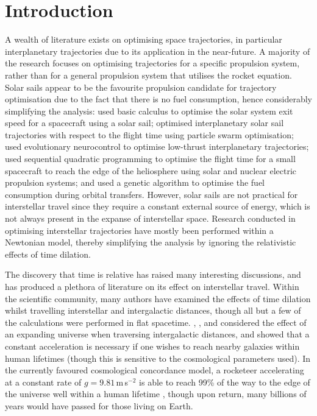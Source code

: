 \documentclass[review]{elsarticle}
\begin{document}
\linenumbers

\section{Introduction}

A wealth of literature exists on optimising space trajectories, in particular interplanetary trajectories due to its application in the near-future. A majority of the research focuses on optimising trajectories for a specific propulsion system, rather than for a general propulsion system that utilises the rocket equation. Solar sails appear to be the favourite propulsion candidate for trajectory optimisation due to the fact that there is no fuel consumption, hence considerably simplifying the analysis: \cite{Cassenti1997} used basic calculus to optimise the solar system exit speed for a spacecraft using a solar sail; \cite{Zeng2011} optimised interplanetary solar sail trajectories with respect to the flight time using particle swarm optimisation; \cite{Dachwald2004,Dachwald2005} used evolutionary neurocontrol to optimise low-thrust interplanetary trajectories; \cite{Kluever1996} used sequential quadratic programming to optimise the flight time for a small spacecraft to reach the edge of the heliosphere using solar and nuclear electric propulsion systems; and \cite{Abdelkhalik2007} used a genetic algorithm to optimise the fuel consumption during orbital transfers. However, solar sails are not practical for interstellar travel since they require a constant external source of energy, which is not always present in the expanse of interstellar space. Research conducted in optimising interstellar trajectories have mostly been performed within a Newtonian model, thereby simplifying the analysis by ignoring the relativistic effects of time dilation. 

The discovery that time is relative has raised many interesting discussions, and has produced a plethora of literature on its effect on interstellar travel. Within the scientific community, many authors have examined the effects of time dilation whilst travelling interstellar and intergalactic distances, though all but a few of the calculations were performed in flat spacetime. \cite{Heyl2005}, \cite{Rindler1960}, and \cite{Kwan2010} considered the effect of an expanding universe when traversing intergalactic distances, and showed that a constant acceleration is necessary if one wishes to reach nearby galaxies within human lifetimes (though this is sensitive to the cosmological parameters used). In the currently favoured cosmological concordance model, a rocketeer accelerating at a constant rate of $g=9.81\,$m\,s$^{-2}$ is able to reach 99\% of the way to the edge of the universe well within a human lifetime \citep{Kwan2010}, though upon return, many billions of years would have passed for those living on Earth. 
\end{document}
